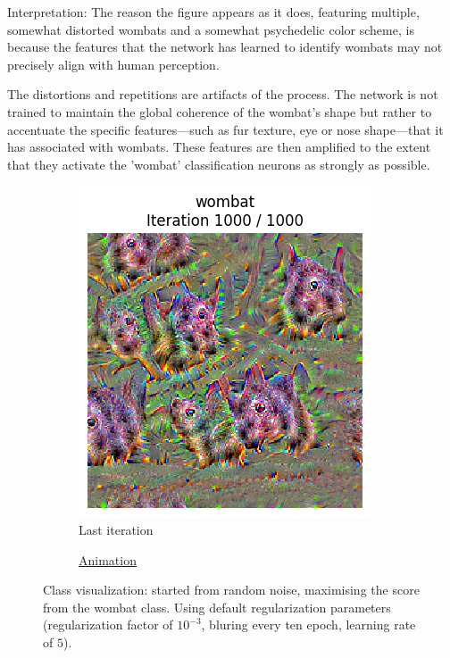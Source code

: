 Interpretation: The reason the figure appears as it does, featuring multiple, somewhat distorted wombats and a somewhat psychedelic color scheme, is because the features that the network has learned to identify wombats may not precisely align with human perception.

The distortions and repetitions are artifacts of the process. The network is not trained to maintain the global coherence of the wombat's shape but rather to accentuate the specific features—such as fur texture, eye or nose shape—that it has associated with wombats. These features are then amplified to the extent that they activate the 'wombat' classification neurons as strongly as possible.

\begin{figure}[H]
    \centering
    \begin{subfigure}{.5\textwidth}
        \centering
        \includegraphics[width=.7\linewidth]{SqueezeNet/wombat_animated_1000_last_frame.png}
        \caption{Last iteration}
        \label{fig:class_viz_wombat:png}
    \end{subfigure}%
    \begin{subfigure}{.5\textwidth}
        \centering
        \caption{\href{figs/2b/SqueezeNet/wombat_animated_1000.mp4}{Animation}}
        \label{fig:class_viz_wombat:vid}
    \end{subfigure}
    \caption{Class visualization: started from random noise, maximising the score from the wombat class. Using default regularization parameters (regularization factor of $10^{-3}$, bluring every ten epoch, learning rate of $5$).}
    \label{fig:class_viz_wombat}
\end{figure}

